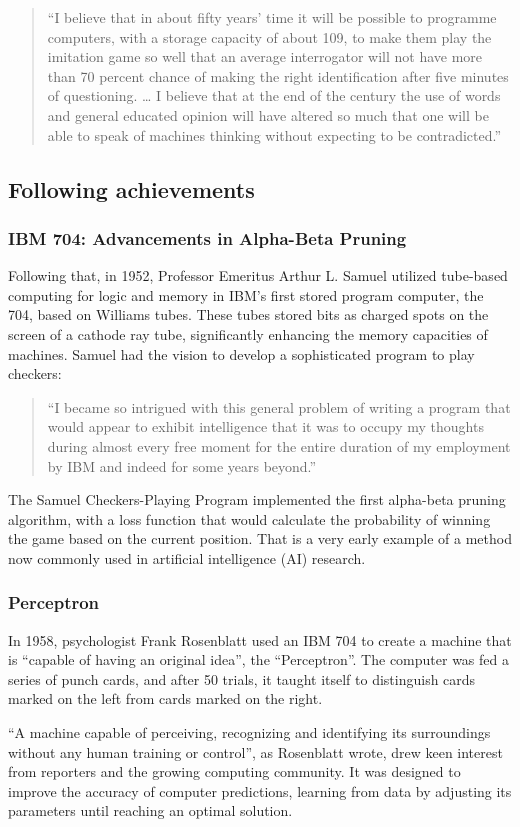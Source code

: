 \documentclass{article}
\begin{document}
\par
\begin{quote}
“I believe that in about fifty years’ time it will be possible to programme computers, with a storage capacity of about 109, to make them play the imitation game so well that an average interrogator will not have more than 70 percent chance of making the right identification after five minutes of questioning. … I believe that at the end of the century the use of words and general educated opinion will have altered so much that one will be able to speak of machines thinking without expecting to be contradicted.” 
\end{quote}
\par
\subsection{Following achievements}
\subsubsection{IBM 704: Advancements in Alpha-Beta Pruning}
Following that, in 1952, Professor Emeritus Arthur L. Samuel utilized tube-based computing for logic and memory in IBM’s first stored program computer, the 704, based on Williams tubes. These tubes stored bits as charged spots on the screen of a cathode ray tube, significantly enhancing the memory capacities of machines. Samuel had the vision to develop a sophisticated program to play checkers: 
\par
\begin{quote}
“I became so intrigued with this general problem of writing a program that would appear to exhibit intelligence that it was to occupy my thoughts during almost every free moment for the entire duration of my employment by IBM and indeed for some years beyond.” 
\end{quote}
\par
The Samuel Checkers-Playing Program implemented the first alpha-beta pruning algorithm, with a loss function that would calculate the probability of winning the game based on the current position. That is a very early example of a method now commonly used in artificial intelligence (AI) research. 
\par
\subsubsection{Perceptron}
In 1958, psychologist Frank Rosenblatt used an IBM 704 to create a machine that is ``capable of having an original idea'', the ``Perceptron''. The computer was fed a series of punch cards, and after 50 trials, it taught itself to distinguish cards marked on the left from cards marked on the right. 
\par
“A machine capable of perceiving, recognizing and identifying its surroundings without any human training or control”, as Rosenblatt wrote, drew keen interest from reporters and the growing computing community. It was designed to improve the accuracy of computer predictions, learning from data by adjusting its parameters until reaching an optimal solution. 
\par
\end{document}
